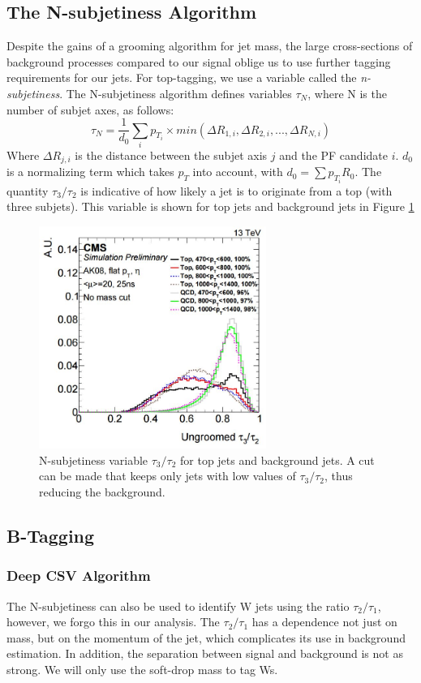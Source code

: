 {\subsection{The N-subjetiness Algorithm}
Despite the gains of a grooming algorithm for jet mass, the large cross-sections of background processes compared to our signal oblige us to use further tagging requirements for our jets. For top-tagging, we use a variable called the \textit{n-subjetiness}\cite{Thaler:2010tr,Thaler:2011gf}. The N-subjetiness algorithm defines variables $\tau_N$, where N is the number of subjet axes,
 as follows:
\begin{equation}
\tau_N = \frac{1}{d_0}\sum_i p_{T_i}\times min(\Delta R_{1,i},\Delta R_{2,i},...,\Delta R_{N,i})
\end{equation}
Where $\Delta R_{j,i}$ is the distance between the subjet axis $j$ and the PF candidate $i$. $d_0$ is a normalizing term which takes $p_T$ into account, with $d_0 = \sum p_{T_i} R_0$. The quantity $\tau_3/\tau_2$ is indicative of how likely a jet is to originate from a top (with three subjets). This variable is shown for top jets and background jets in Figure \ref{Fig:Tag:Tau32}
\begin{figure}[h!]
    \centering
        \includegraphics[width=0.66\textwidth]{F4/Tau32}
        \caption{N-subjetiness variable $\tau_3/\tau_2$ for top jets and background jets. A cut can be made that keeps only jets with low values of $\tau_3/\tau_2$, thus reducing the background.}
        \label{Fig:Tag:Tau32}
\end{figure}
\subsection{B-Tagging}
\subsubsection{Deep CSV Algorithm}
The N-subjetiness can also be used to identify W jets using the ratio $\tau_2/\tau_1$, however, we forgo this in our analysis. The $\tau_2/\tau_1$ has a dependence not just on mass, but on the momentum of the jet, which complicates its use in background estimation. In addition, the separation between signal and background is not as strong. We will only use the soft-drop mass to tag Ws.

}

